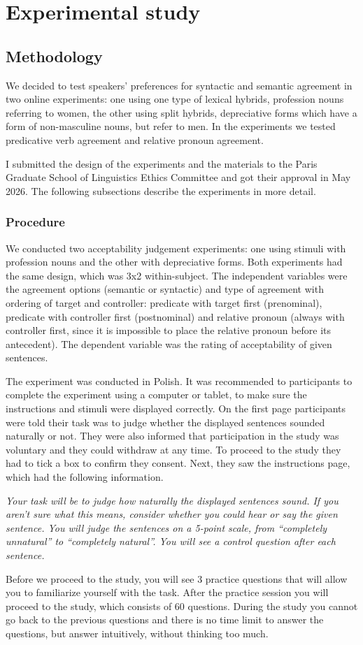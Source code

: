 \chapter{Experimental study}
\startcontents[chapters]

\section{Methodology}
We decided to test speakers' preferences for syntactic and semantic agreement in two online experiments: one using one type of lexical hybrids, profession nouns referring to women, the other using split hybrids, depreciative forms which have a form of non-masculine nouns, but refer to men. In the experiments we tested predicative verb agreement and relative pronoun agreement.

I submitted the design of the experiments and the materials to the Paris Graduate School of Linguistics Ethics Committee and got their approval in May 2026. The following subsections describe the experiments in more detail.

\subsection{Procedure}
We conducted two acceptability judgement experiments: one using stimuli with profession nouns and the other with depreciative forms. Both experiments had the same design, which was 3x2 within-subject. The independent variables were the agreement options (semantic or syntactic) and type of agreement with ordering of target and controller: predicate with target first (prenominal), predicate with controller first (postnominal) and relative pronoun (always with controller first, since it is impossible to place the relative pronoun before its antecedent). The dependent variable was the rating of acceptability of given sentences.

The experiment was conducted in Polish. It was recommended to participants to complete the experiment using a computer or tablet, to make sure the instructions and stimuli were displayed correctly. On the first page participants were told their task was to judge whether the displayed sentences sounded naturally or not. They were also informed that participation in the study was voluntary and they could withdraw at any time. To proceed to the study they had to tick a box to confirm they consent. Next, they saw the instructions page, which had the following information.

{\slshape
  Your task will be to judge how naturally the displayed sentences sound. If you aren't sure what this means, consider whether you could hear or say the given sentence. You will judge the sentences on a 5-point scale, from ``completely unnatural'' to ``completely natural''. You will see a control question after each sentence.

  Before we proceed to the study, you will see 3 practice questions that will allow you to familiarize yourself with the task. After the practice session you will proceed to the study, which consists of 60 questions. During the study you cannot go back to the previous questions and there is no time limit to answer the questions, but answer intuitively, without thinking too much.
}

